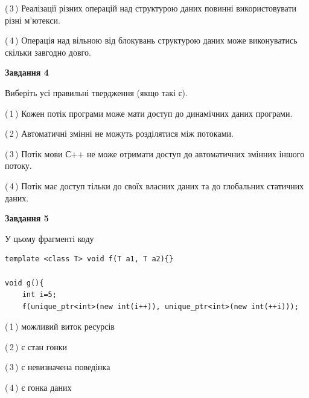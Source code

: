 \documentclass[12pt, ukrainian]{article}
\begin{document}
\begin {large}
{(\,3\,) Реалізації різних операцій над структурою даних повинні використовувати різні м’ютекси.%

(\,4\,) Операція над вільною від блокувань структурою даних може виконуватись скільки завгодно довго.%



\begin{center}
\textbf{Завдання 4}
\end{center}
Виберіть усі правильні твердження (якщо такі є).\par
\vspace{2mm}

(\,1\,) Кожен потік програми може мати доступ до динамічних даних програми.%

(\,2\,) Автоматичні змінні не можуть розділятися між потоками.%

(\,3\,) Потік мови С++ не може отримати доступ до автоматичних змінних іншого потоку.%

(\,4\,) Потік має доступ тільки до своїх власних даних та до глобальних статичних даних.%



\begin{center}
\textbf{Завдання 5}
\end{center}
У цьому фрагменті коду
\begin{verbatim}
template <class T> void f(T a1, T a2){}

void g(){
    int i=5;
    f(unique_ptr<int>(new int(i++)), unique_ptr<int>(new int(++i)));
\end{verbatim}

(\,1\,) можливий виток ресурсів%

(\,2\,) є стан гонки%

(\,3\,) є невизначена поведінка%

(\,4\,) є гонка даних%


}
\end {large}
\end{document}
